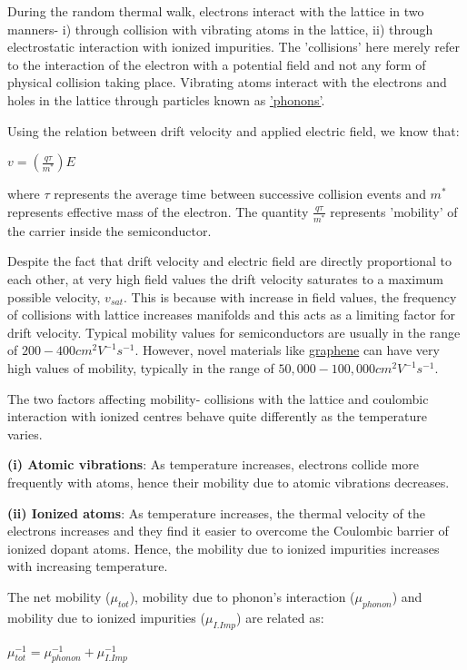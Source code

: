\documentclass[12 pt]{article}
\begin{document}
During the random thermal walk, electrons interact with the lattice in two manners-  i) through collision with vibrating atoms in the lattice, ii) through electrostatic interaction with ionized impurities. The 'collisions' here merely refer to the interaction of the electron with a potential field and not any form of physical collision taking place. Vibrating atoms interact with the electrons and holes in the lattice through particles known as \href{https://en.wikipedia.org/wiki/Phonon}{'phonons'}.\par

Using the relation between drift velocity and applied electric field, we know that:
\begin{center}
    $ v = (\frac{q\tau}{m^{*}})E $
\end{center}
where $\tau$ represents the average time between successive collision events and $m^{*}$ represents effective mass of the electron. The quantity $\frac{q\tau}{m^{*}}$ represents 'mobility' of the carrier inside the semiconductor.\par

Despite the fact that drift velocity and electric field are directly proportional to each other, at very high field values the drift velocity saturates to a maximum possible velocity, $v_{sat}$. This is because with increase in field values, the frequency of collisions with lattice increases manifolds and this acts as a limiting factor for drift velocity. Typical mobility values for semiconductors are usually in the range of $200-400          cm^{2}V^{-1}s^{-1}$. However, novel materials like \href{https://en.wikipedia.org/wiki/Graphene}{graphene} can have very high values of mobility, typically in the range of $50,000-100,000    
 cm^{2}V^{-1}s^{-1}$.\par

The two factors affecting mobility- collisions with the lattice and coulombic interaction with ionized centres behave quite differently as the temperature varies.\par
\textbf{(i) Atomic vibrations}: As temperature increases, electrons collide more frequently with atoms, hence their mobility due to atomic vibrations decreases.\par
\textbf{(ii) Ionized atoms}: As temperature increases, the thermal velocity of the electrons increases and they find it easier to overcome the Coulombic barrier of ionized dopant atoms. Hence, the mobility due to ionized impurities increases with increasing temperature.\par
The net mobility ($\mu_{tot}$), mobility due to phonon's interaction ($\mu_{phonon}$) and mobility due to ionized impurities ($\mu_{I.Imp}$) are related as:
\begin{center}
    $ \mu_{tot}^{-1} = \mu_{phonon}^{-1} + \mu_{I.Imp}^{-1}  $
\end{center}
\end{document}
